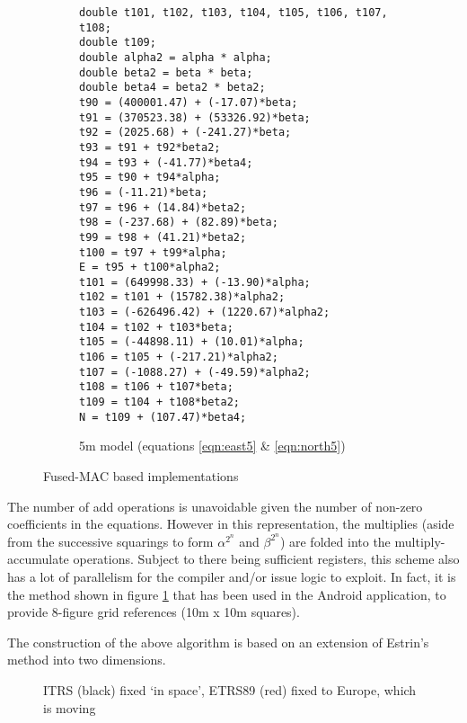 \documentclass[10pt,a4paper]{article}
\def\tkname#1{}
\begin{document}
\begin{figure}[htb]
\begin{subfigure}[b]{0.45\textwidth}
\begin{verbatim}
double t101, t102, t103, t104, t105, t106, t107, t108;
double t109;
double alpha2 = alpha * alpha;
double beta2 = beta * beta;
double beta4 = beta2 * beta2;
t90 = (400001.47) + (-17.07)*beta;
t91 = (370523.38) + (53326.92)*beta;
t92 = (2025.68) + (-241.27)*beta;
t93 = t91 + t92*beta2;
t94 = t93 + (-41.77)*beta4;
t95 = t90 + t94*alpha;
t96 = (-11.21)*beta;
t97 = t96 + (14.84)*beta2;
t98 = (-237.68) + (82.89)*beta;
t99 = t98 + (41.21)*beta2;
t100 = t97 + t99*alpha;
E = t95 + t100*alpha2;
t101 = (649998.33) + (-13.90)*alpha;
t102 = t101 + (15782.38)*alpha2;
t103 = (-626496.42) + (1220.67)*alpha2;
t104 = t102 + t103*beta;
t105 = (-44898.11) + (10.01)*alpha;
t106 = t105 + (-217.21)*alpha2;
t107 = (-1088.27) + (-49.59)*alpha2;
t108 = t106 + t107*beta;
t109 = t104 + t108*beta2;
N = t109 + (107.47)*beta4;
    \end{verbatim}
\caption{5m model (equations \eqref{eqn:east5} \& \eqref{eqn:north5})}
    \label{fig:impl-5m}
\end{subfigure}

  \caption{Fused-MAC based implementations}
  \label{fig:fused-mac}

  \hrulefill

\end{figure}

The number of add operations is unavoidable given the number of non-zero
coefficients in the equations.  However in this representation, the multiplies
(aside from the successive squarings to form $\alpha^{2^n}$ and $\beta^{2^n}$) are
folded into the multiply-accumulate operations.  Subject to there being
sufficient registers, this scheme also has a lot of parallelism for the
compiler and/or issue logic to exploit.  In fact, it is the method shown in
figure \ref{fig:impl-5m} that has been used in the Android application, to
provide 8-figure grid references (10m x 10m squares).

The construction of the above algorithm is based on an extension of Estrin's
method \cite{estrin} into two dimensions.

\begin{figure}[htb]
  \centering
  \tkname{tectonic}
  \caption{ITRS (black) fixed `in space', ETRS89 (red) fixed to Europe, which is moving}
  \label{fig:tectonic}
\end{figure}
\end{document}

